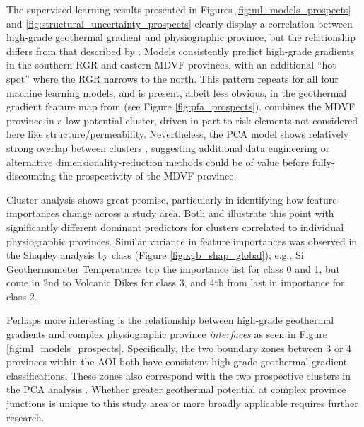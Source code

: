 The supervised learning results presented in Figures \ref{fig:ml_models_prospects} and \ref{fig:structural_uncertainty_prospects} clearly display a correlation between high-grade geothermal gradient and physiographic province, but the relationship differs from that described by \citet{pepin_new_2019}. Models consistently predict high-grade gradients in the southern RGR and eastern MDVF provinces, with an additional ``hot spot'' where the RGR narrows to the north. This pattern repeats for all four machine learning models, and is present, albeit less obvious, in the geothermal gradient feature map from \citet{bielicki_hydrogeolgic_2015} (see Figure \ref{fig:pfa_prospects}). \citet{pepin_new_2019} combines the MDVF province in a low-potential cluster, driven in part to risk elements not considered here like structure/permeability. Nevertheless, the PCA model shows relatively strong overlap between clusters \citep[Figure 3.4,][]{pepin_new_2019}, suggesting additional data engineering or alternative dimensionality-reduction methods could be of value before fully-discounting the prospectivity of the MDVF province.

Cluster analysis shows great promise, particularly in identifying how feature importances change across a study area. Both \citep{pepin_new_2019} and \citep{smith_characterizing_2021} illustrate this point with significantly different dominant predictors for clusters correlated to individual physiographic provinces. Similar variance in feature importances was observed in the Shapley analysis by class (Figure \ref{fig:xgb_shap_global}); e.g., Si Geothermometer Temperatures top the importance list for class 0 and 1, but come in 2nd to Volcanic Dikes for class 3, and 4th from last in importance for class 2.

Perhaps more interesting is the relationship between high-grade geothermal gradients and complex physiographic province \textit{interfaces} as seen in Figure \ref{fig:ml_models_prospects}. Specifically, the two boundary zones between 3 or 4 provinces within the AOI both have consistent high-grade geothermal gradient classifications. These zones also correspond with the two prospective clusters in the PCA analysis \citep{pepin_new_2019}. Whether greater geothermal potential at complex province junctions is unique to this study area or more broadly applicable requires further research.

